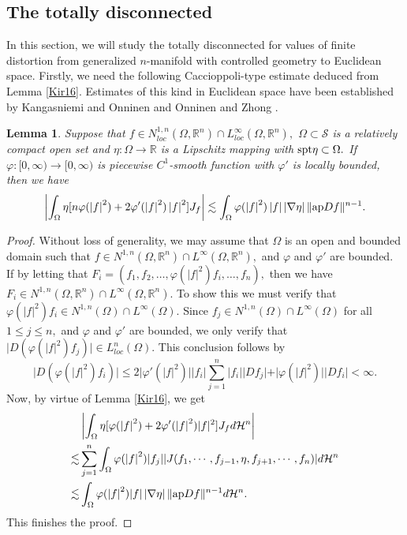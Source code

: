 \documentclass[11pt,twoside]{article}
\newtheorem{lem}[thm]{Lemma}
\theoremstyle{definition}
\theoremstyle{remark}
\newcommand{\abs}[1]{\left|#1\right|}
\newcommand{\aleq}{\lesssim}
\begin{document}
\subsection{The totally disconnected}
In this section, we will study  the totally disconnected  for values of finite distortion from generalized $n$-manifold with controlled geometry to Euclidean space.
Firstly, we need the following Caccioppoli-type estimate deduced from Lemma \ref{Kir16}. Estimates of this kind  in Euclidean space have been established by  Kangasniemi and  Onninen \cite[Lemma 6.2]{KO221} and  Onninen and Zhong \cite[Lemma 2.1]{OZ08}. 
\begin{lem}\label{shksujck}
Suppose that $f\in N_{loc}^{1,n}(\Omega,\mathbb{R}^{n})\cap L_{loc}^{\infty}(\Omega,\mathbb{R}^{n}),$ $\Omega\subset\mathcal{S}$ is a relatively compact open set and $\eta:\Omega\rightarrow \mathbb{R}$ is a Lipschitz mapping with 
  ${\rm spt}\eta\subset\Omega.$ If $\varphi:[0,\infty)\rightarrow [0,\infty)$ is piecewise $C^{1}$-smooth function with $\varphi'$ is locally bounded, then we have
  \begin{equation}
  \abs{\int_{\Omega}\eta [n\varphi(\abs{f}^{2})+2\varphi'(\abs{f}^{2})\abs{f}^{2}]J_{f}}
  \aleq\int_{\Omega}\varphi(\abs{f}^{2})\abs{f}\abs{\nabla\eta}\| {\rm ap}Df\|^{n-1}.
  \end{equation}
\end{lem}
\begin{proof}
Without loss of generality, we may assume that $\Omega$ is an open and bounded domain such that $f\in N^{1,n}(\Omega,\mathbb{R}^{n})\cap L^{\infty}(\Omega,\mathbb{R}^{n}),$ and $\varphi$ and $\varphi'$
are bounded. If by letting that $F_{i}=(f_{1},f_{2},\ldots,\varphi(\vert f\vert^{2})f_{i},\ldots,f_{n}),$ then we have  $F_{i}\in N^{1,n}(\Omega,\mathbb{R}^{n})\cap L^{\infty}(\Omega,\mathbb{R}^{n}).$ To show this we must verify that 
$\varphi(\vert f\vert^{2})f_{i}\in N^{1,n}(\Omega)\cap L^{\infty}(\Omega).$ Since  $f_{j}\in N^{1,n}(\Omega)\cap L^{\infty}(\Omega)$ for all $1\leq j\leq n,$ and 
$\varphi$ and $\varphi'$ are bounded,  we only verify that $\vert D(\varphi(\vert f\vert^{2})f_{j})\vert\in L_{loc}^{n}(\Omega).$   This conclusion follows by 
$$\vert D(\varphi(\vert f\vert^{2})f_{i})\vert\leq2\vert\varphi'(\vert f\vert^{2})\vert\vert f_{i}\vert\sum_{j=1}^{n}\vert f_{i}\vert\vert Df_{j}\vert+\vert\varphi(\vert f\vert^{2})\vert\vert Df_{i}\vert<\infty.$$  
Now, by virtue of Lemma \ref{Kir16}, we get 
\begin{equation}
\begin{aligned}
&\abs{\int_{\Omega}\eta [\varphi(\abs{f}^{2})+2\varphi'(\abs{f}^{2})\vert f\vert^{2}] J_{f}d\mathcal{H}^{n}}\\
\aleq&\sum_{j=1}^{n}\int_{\Omega}\varphi(\abs{f}^{2}) \vert f_{j}\vert\vert J(f_{1},\cdots,f_{j-1},\eta,f_{j+1},\cdots,f_{n})\vert d\mathcal{H}^{n}\\
\aleq&\int_{\Omega}\varphi(\abs{f}^{2}) \vert f\vert\abs{\nabla\eta}\|{\rm ap}Df\|^{n-1} d\mathcal{H}^{n}.
\end{aligned}
\end{equation}
This finishes the proof.
\end{proof}
\end{document}
